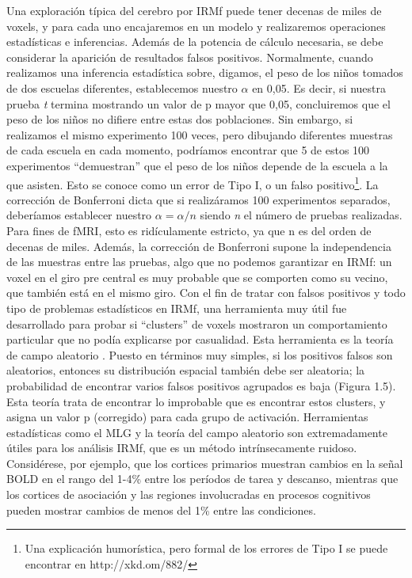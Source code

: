 \documentclass[12pt,a5,twoside]{book}
\begin{document}
Una exploración típica del cerebro por IRMf puede tener decenas de miles de voxels, y para cada uno encajaremos en un modelo y realizaremos operaciones estadísticas e inferencias. Además de la potencia de cálculo necesaria, se debe considerar la aparición de resultados falsos positivos. Normalmente, cuando realizamos una inferencia estadística sobre, digamos, el peso de los niños tomados de dos escuelas diferentes, establecemos nuestro \(\alpha\) en 0,05. Es decir, si nuestra prueba {\it t} termina mostrando un valor de p mayor que 0,05, concluiremos que el peso de los niños no difiere entre estas dos poblaciones. Sin embargo, si realizamos el mismo experimento 100 veces, pero dibujando diferentes muestras de cada escuela en cada momento, podríamos encontrar que 5 de estos 100 experimentos ``demuestran'' que el peso de los niños depende de la escuela a la que asisten. Esto se conoce como un error de Tipo I, o un falso positivo\footnote{Una explicación humorística, pero formal de los errores de Tipo I se puede encontrar en http://xkd.om/882/}. La corrección de Bonferroni dicta que si realizáramos 100 experimentos separados, deberíamos establecer nuestro $\alpha = \alpha/n$ siendo {\it n} el número de pruebas realizadas. Para fines de fMRI, esto es ridículamente estricto, ya que n es del orden de decenas de miles. Además, la corrección de Bonferroni supone la independencia de las muestras entre las pruebas, algo que no podemos garantizar en IRMf: un voxel en el giro pre central es muy probable que se comporten como su vecino, que también está en el mismo giro. Con el fin de tratar con falsos positivos y todo tipo de problemas estadísticos en IRMf, una herramienta muy útil fue desarrollado para probar si ``clusters'' de voxels mostraron un comportamiento particular que no podía explicarse por casualidad. Esta herramienta es la teoría de campo aleatorio \citep{Worsley_1999}. Puesto en términos muy simples, si los positivos falsos son aleatorios, entonces su distribución espacial también debe ser aleatoria; la probabilidad de encontrar varios falsos positivos agrupados es baja (Figura 1.5). Esta teoría trata de encontrar lo improbable que es encontrar estos clusters, y asigna un valor p (corregido) para cada grupo de activación. Herramientas estadísticas como el MLG y la teoría del campo aleatorio son extremadamente útiles para los análisis IRMf, que es un método intrínsecamente ruidoso. Considérese, por ejemplo, que los cortices primarios muestran cambios en la señal BOLD en el rango del 1-4\% entre los períodos de tarea y descanso, mientras que los cortices de asociación y las regiones involucradas en procesos cognitivos pueden mostrar cambios de menos del 1\% entre las condiciones.
\end{document}
